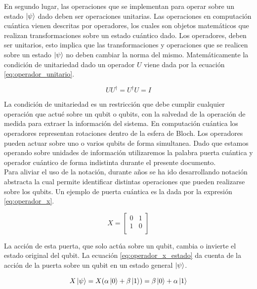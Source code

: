 En segundo lugar, las operaciones que se implementan para operar sobre un estado $\ket{\psi}$ dado deben ser operaciones unitarias. Las operaciones en computación cuántica vienen descritas por operadores, los cuales son objetos matemáticos que realizan transformaciones sobre un estado cuántico dado. Los operadores, deben ser unitarios, esto implica que las transformaciones y operaciones que se realicen sobre un estado $\ket{\psi}$ no deben cambiar la norma del mismo. Matemáticamente la condición de  unitariedad dado un operador $U$ viene dada por la ecuación \ref{eq:operador_unitario}.

\begin{equation}
    U U^{\dagger} = U^{\dagger} U = I
    \label{eq:operador_unitario}
\end{equation}

\newpage

La condición de unitariedad es un restricción que debe cumplir cualquier operación que actué sobre un qubit o qubits, con la salvedad de la operación de medida para extraer la información del sistema. En computación cuántica los operadores representan rotaciones dentro de la esfera de Bloch. Los operadores pueden actuar sobre uno o varios qubits de forma simultanea. Dado que estamos operando sobre unidades de información utilizaremos la palabra puerta cuántica y operador cuántico de forma indistinta durante el presente documento.  \\

Para aliviar el uso de la notación, durante años se ha ido desarrollando notación abstracta la cual permite identificar distintas operaciones que pueden realizarse sobre los qubits. Un ejemplo de puerta cuántica es la dada por la expresión \ref{eq:operador_x}.


\begin{equation}
    X = \begin{bmatrix}
    0 & 1 \\
    1 & 0 \\
    \end{bmatrix}
    \label{eq:operador_x}
\end{equation}

La acción de esta puerta, que solo actúa sobre un qubit, cambia o invierte el estado original del qubit. La ecuación \ref{eq:operador_x_estado} da cuenta de la acción de la puerta sobre un qubit en un estado general $\ket{\psi}$.

\begin{equation}
    X \ket{\psi} = X(\alpha\ket{0} + \beta\ket{1}) = \beta\ket{0} + \alpha\ket{1}
    \label{eq:operador_x_estado}
\end{equation}

